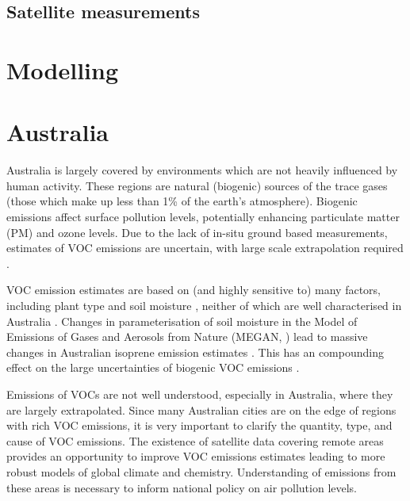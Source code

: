   
  
  
  \subsection{Satellite measurements}
  \label{LR:HCHO:Sat}
  
\section{Modelling}
\label{LR:Models}

\section{Australia}
\label{LR:Aus}
  Australia is largely covered by environments which are not heavily influenced by human activity.
  These regions are natural (biogenic) sources of the trace gases (those which make up less than 1\% of the earth's atmosphere).
  Biogenic emissions affect surface pollution levels, potentially enhancing particulate matter (PM) and ozone levels.
  Due to the lack of in-situ ground based measurements, estimates of VOC emissions are uncertain, with large scale extrapolation required \cite{Millet2006}.
  
  VOC emission estimates are based on (and highly sensitive to) many factors, including plant type and soil moisture \citep{Guenther1995}, neither of which are well characterised in Australia \citep{Sindelarova2014, Bauwens2016}.
  Changes in parameterisation of soil moisture in the Model of Emissions of Gases and Aerosols from Nature (MEGAN, \cite{Guenther1995}) lead to massive changes in Australian isoprene emission estimates \citep{Sindelarova2014}.
  This has an compounding effect on the large uncertainties of biogenic VOC emissions \citep{Guenther2000, Millet2006}.
  
  Emissions of VOCs are not well understood, especially in Australia, where they are largely extrapolated.  
  Since many Australian cities are on the edge of regions with rich VOC emissions, it is very important to clarify the quantity, type, and cause of VOC emissions.
  The existence of satellite data covering remote areas provides an opportunity to improve VOC emissions estimates leading to more robust models of global climate and chemistry.
  Understanding of emissions from these areas is necessary to inform national policy on air pollution levels.
  
